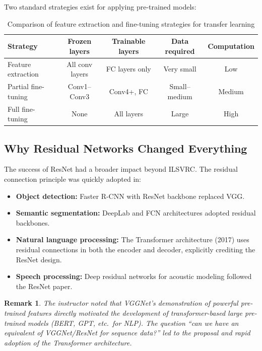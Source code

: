 \documentclass[12pt,a4paper]{article}
\newtheorem{remark}{Remark}[section]
\begin{document}
Two standard strategies exist for applying pre-trained models:

\begin{table}[ht]
\centering
\caption{Comparison of feature extraction and fine-tuning strategies for transfer learning}
\label{tab:transfer_strategies}
\begin{tabular}{@{}lcccc@{}}
\toprule
Strategy & Frozen layers & Trainable layers & Data required & Computation \\
\midrule
Feature extraction & All conv layers & FC layers only & Very small & Low \\
Partial fine-tuning & Conv1--Conv3 & Conv4+, FC & Small--medium & Medium \\
Full fine-tuning & None & All layers & Large & High \\
\bottomrule
\end{tabular}
\end{table}

\subsection{Why Residual Networks Changed Everything}

The success of ResNet had a broader impact beyond ILSVRC. The residual connection principle was quickly adopted in:

\begin{itemize}[leftmargin=2em]
  \item \textbf{Object detection:} Faster R-CNN with ResNet backbone replaced VGG.
  \item \textbf{Semantic segmentation:} DeepLab and FCN architectures adopted residual backbones.
  \item \textbf{Natural language processing:} The Transformer architecture (2017) uses residual connections in both the encoder and decoder, explicitly crediting the ResNet design.
  \item \textbf{Speech processing:} Deep residual networks for acoustic modeling followed the ResNet paper.
\end{itemize}

\begin{remark}
The instructor noted that VGGNet's demonstration of powerful pre-trained features directly motivated the development of transformer-based large pre-trained models (BERT, GPT, etc.\ for NLP). The question ``can we have an equivalent of VGGNet/ResNet for sequence data?'' led to the proposal and rapid adoption of the Transformer architecture.
\end{remark}
\end{document}
